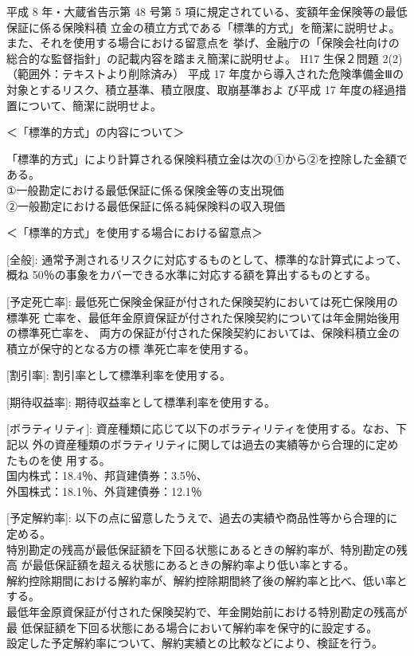 \documentclass[report,gutter=10mm,fore-edge=10mm,uplatex,dvipdfmx]{jlreq}
\begin{document}
{

平成 8 年・大蔵省告示第 48 号第 5 項に規定されている、変額年金保険等の最低保証に係る保険料積
立金の積立方式である「標準的方式」を簡潔に説明せよ。また、それを使用する場合における留意点を
挙げ、金融庁の「保険会社向けの総合的な監督指針」の記載内容を踏まえ簡潔に説明せよ。
H17 生保２問題 2(2) （範囲外：テキストより削除済み）
平成 17 年度から導入された危険準備金Ⅲの対象とするリスク、積立基準、積立限度、取崩基準およ
び平成 17 年度の経過措置について、簡潔に説明せよ。

\answer{}
＜「標準的方式」の内容について＞

「標準的方式」により計算される保険料積立金は次の①から②を控除した金額である。\\
①一般勘定における最低保証に係る保険金等の支出現価\\
②一般勘定における最低保証に係る純保険料の収入現価

＜「標準的方式」を使用する場合における留意点＞

[全般]: 通常予測されるリスクに対応するものとして、標準的な計算式によって、概ね
50％の事象をカバーできる水準に対応する額を算出するものとする。

[予定死亡率]: 最低死亡保険金保証が付された保険契約においては死亡保険用の標準死
亡率を、最低年金原資保証が付された保険契約については年金開始後用の標準死亡率を、
両方の保証が付された保険契約においては、保険料積立金の積立が保守的となる方の標
準死亡率を使用する。

[割引率]: 割引率として標準利率を使用する。

[期待収益率]: 期待収益率として標準利率を使用する。

[ボラティリティ]: 資産種類に応じて以下のボラティリティを使用する。なお、下記以
外の資産種類のボラティリティに関しては過去の実績等から合理的に定めたものを使
用する。\\
国内株式：18.4％、邦貨建債券：3.5％、\\
外国株式：18.1％、外貨建債券：12.1％

[予定解約率]: 以下の点に留意したうえで、過去の実績や商品性等から合理的に定める。\\
特別勘定の残高が最低保証額を下回る状態にあるときの解約率が、特別勘定の残高
が最低保証額を超える状態にあるときの解約率より低い率とする。\\
解約控除期間における解約率が、解約控除期間終了後の解約率と比べ、低い率とする。\\
最低年金原資保証が付された保険契約で、年金開始前における特別勘定の残高が最
低保証額を下回る状態にある場合において解約率を保守的に設定する。\\
設定した予定解約率について、解約実績との比較などにより、検証を行う。

}
\end{document}
